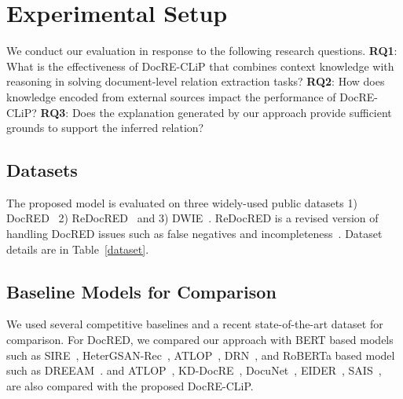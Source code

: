 \documentclass[letterpaper]{article} %
\begin{document}
\section{Experimental Setup}
We conduct our evaluation in response to the following research questions.
\textbf{RQ1}: What is the effectiveness of DocRE-CLiP that combines context knowledge with reasoning in solving document-level relation extraction tasks? \textbf{RQ2}: How does knowledge encoded from external sources impact the performance of DocRE-CLiP? \textbf{RQ3}: Does the explanation generated by our approach provide sufficient grounds to support the inferred relation?
\subsection{Datasets}
The proposed model is evaluated on three widely-used public datasets 1) DocRED~\cite{yao-etal-2019-docred} 2) ReDocRED~\cite{DBLP:conf/eacl/MaWO23} and 3) DWIE~\cite{DBLP:journals/ipm/ZaporojetsDDD21}. ReDocRED is a revised version of handling DocRED issues such as false negatives and incompleteness~\cite{DBLP:conf/emnlp/Tan0BNA22}. Dataset details are in Table~\ref{dataset}.
\begin{table}[ht]
\caption{Dataset statistics}
    \label{dataset}
\end{table}



\subsection{Baseline Models for Comparison}
We used several competitive baselines and a recent state-of-the-art dataset for comparison. For DocRED, we compared our approach with
BERT based models such as
SIRE~\cite{zeng-etal-2021-sire},
HeterGSAN-Rec~\cite{DBLP:conf/aaai/XuCZ21},
ATLOP~\cite{DBLP:conf/aaai/Zhou0M021},
DRN~\cite{xu-etal-2021-discriminative}, and RoBERTa based model such as DREEAM~\cite{DBLP:conf/eacl/MaWO23}.
and ATLOP~\cite{DBLP:conf/aaai/Zhou0M021},
KD-DocRE~\cite{tan-etal-2022-document},
DocuNet~\cite{ijcai2021p551},
EIDER~\cite{xie-etal-2022-eider}, SAIS~\cite{xiao-etal-2022-sais},
~\cite{DBLP:conf/aaai/Zhou0M021} are also compared with the proposed DocRE-CLiP.
\end{document}
